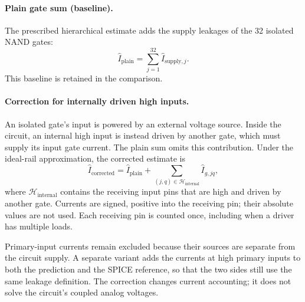 \paragraph{Plain gate sum (baseline).}
The prescribed hierarchical estimate adds the supply leakages of the
32 isolated NAND gates:
\begin{equation}
\widehat I_{\mathrm{plain}}=\sum_{j=1}^{32}\widehat I_{\mathrm{supply},j}.
\end{equation}
This baseline is retained in the comparison.

\paragraph{Correction for internally driven high inputs.}
An isolated gate's input is powered by an external voltage source. Inside
the circuit, an internal high input is instead driven by another gate,
which must supply its input gate current. The plain sum omits this
contribution. Under the ideal-rail approximation, the corrected estimate is
\begin{equation}
\widehat I_{\mathrm{corrected}}=
\widehat I_{\mathrm{plain}}+
\sum_{(j,q)\in\mathcal H_{\mathrm{internal}}}\widehat I_{g,jq},
\end{equation}
where $\mathcal H_{\mathrm{internal}}$ contains the receiving input pins
that are high and driven by another gate. Currents are signed, positive
into the receiving pin; their absolute values are not used. Each receiving
pin is counted once, including when a driver has multiple loads.

Primary-input currents remain excluded because their sources are separate
from the circuit supply. A separate variant adds the currents at high
primary inputs to both the prediction and the SPICE reference, so that the
two sides still use the same leakage definition. The correction changes
current accounting; it does not solve the circuit's coupled analog voltages.

